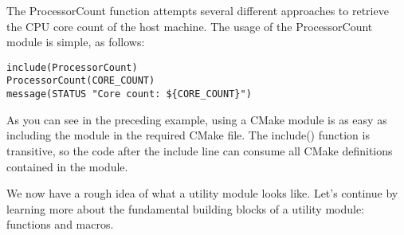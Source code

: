 The ProcessorCount function attempts several different approaches to retrieve the CPU core count of the host machine. The usage of the ProcessorCount module is simple, as follows:

\begin{lstlisting}[style=styleCMake]
include(ProcessorCount)
ProcessorCount(CORE_COUNT)
message(STATUS "Core count: ${CORE_COUNT}")
\end{lstlisting}

As you can see in the preceding example, using a CMake module is as easy as including the module in the required CMake file. The include() function is transitive, so the code after the include line can consume all CMake definitions contained in the module.

We now have a rough idea of what a utility module looks like. Let's continue by learning more about the fundamental building blocks of a utility module: functions and macros.



























